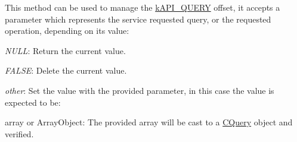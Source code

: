 This method can be used to manage the \hyperlink{}{k\-A\-P\-I\-\_\-\-Q\-U\-E\-R\-Y} offset, it accepts a parameter which represents the service requested query, or the requested operation, depending on its value\-:


\begin{DoxyItemize}
\item {\itshape N\-U\-L\-L}\-: Return the current value. 
\item {\itshape F\-A\-L\-S\-E}\-: Delete the current value. 
\item {\itshape other}\-: Set the value with the provided parameter, in this case the value is expected to be\-: 
\begin{DoxyItemize}
\item {\ttfamily array} or {\ttfamily Array\-Object{\ttfamily \-: The provided array will be cast to a \hyperlink{class_c_query}{C\-Query} object and verified. }}
\item {}
\item {}
\end{DoxyItemize}
\end{DoxyItemize}

{}

